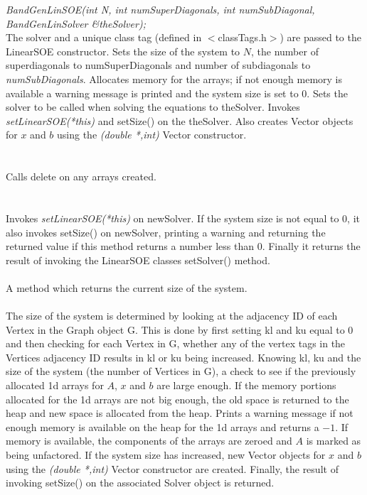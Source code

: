 {\em BandGenLinSOE(int N, int numSuperDiagonals, int numSubDiagonal,
		  BandGenLinSolver \&theSolver);        }\\
The \p solver and a unique class tag (defined in $<$classTags.h$>$)
are passed to the LinearSOE constructor. 
Sets the size of the system to $N$, the number of superdiagonals to 
\p numSuperDiagonals and number of subdiagonals to {\em
numSubDiagonals}. Allocates memory for the arrays; if not enough
memory is available a warning message is printed and the system size
is set to $0$. Sets the solver to be called when solving the
equations to \p theSolver. Invokes {\em setLinearSOE(*this)} and
setSize() on the \p theSolver. Also creates Vector objects
for $x$ and $b$ using the {\em (double *,int)} Vector constructor. \\


 \\
\\ 
Calls delete on any arrays created. \\

  \\
\\
Invokes {\em setLinearSOE(*this)} on \p newSolver.
If the system size is not equal to $0$, it also invokes setSize()
on \p newSolver, printing a warning and returning the returned value if this
method returns a number less than $0$. Finally it returns the result
of invoking the LinearSOE classes setSolver() method. \\

 \\
A method which returns the current size of the system. \\

 \\ 
The size of the system is determined by looking at the adjacency ID of
each Vertex in the Graph object \p G. This is done by first setting
\p kl and \p ku equal to $0$ and then checking for each Vertex
in \p G, whether any of the vertex tags in the Vertices adjacency
ID results in \p kl or \p ku being increased. Knowing \p kl,
\p ku and the size of the system (the number of Vertices in \p G),
a check to see if the previously allocated 1d arrays for $A$, $x$ and
$b$ are large enough. If the memory portions allocated for the 1d
arrays are not big enough, the old space is returned to the heap and
new space is allocated from the heap. Prints a warning message if
not enough memory is available on the heap for the 1d arrays and
returns a $-1$. If memory is available, the components of the arrays
are zeroed and $A$ is marked as being unfactored. If the system size
has increased, new Vector objects for $x$ and $b$ using the {\em (double
*,int)} Vector constructor are created. Finally, the result of
invoking setSize() on the associated Solver object is returned. \\


